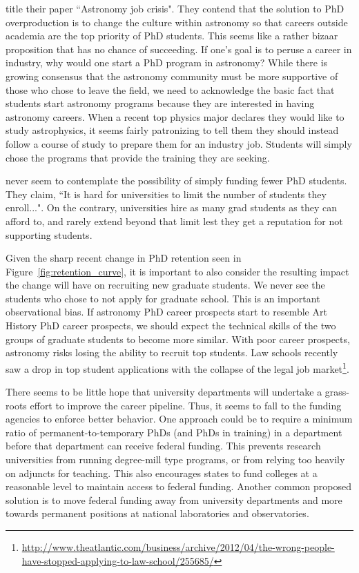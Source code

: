 \documentclass[preprint2]{aastex}
\begin{document}
\citet{Cooray15} title their paper ``Astronomy job crisis".  They contend that the solution to PhD overproduction is to change the culture within astronomy so that careers outside academia are the top priority of PhD students. This seems like a rather bizaar proposition that has no chance of succeeding. If one's goal is to peruse a career in industry, why would one start a PhD program in astronomy? While there is growing consensus that the astronomy community must be more supportive of those who chose to leave the field, we need to acknowledge the basic fact that students start astronomy programs because they are interested in having astronomy careers.  When a recent top physics major declares they would like to study astrophysics, it seems fairly patronizing to tell them they should instead follow a course of study to prepare them for an industry job. Students will simply chose the programs that provide the training they are seeking.

\citet{Cooray15} never seem to contemplate the possibility of simply funding fewer PhD students. They claim, ``It is hard for universities to limit the number of students they enroll...". On the contrary, universities hire as many grad students as they can afford to, and rarely extend beyond that limit lest they get a reputation for not supporting students.  

Given the sharp recent change in PhD retention seen in Figure~\ref{fig:retention_curve}, it is important to also consider the resulting impact the change will have on recruiting new graduate students. We never see the students who chose to not apply for graduate school. This is an important observational bias.  If astronomy PhD career prospects start to resemble Art History PhD career prospects, we should expect the technical skills of the two groups of graduate students to become more similar.  With poor career prospects, astronomy risks losing the ability to recruit top students. Law schools recently saw a drop in top student applications with the collapse of the legal job market\footnote{\url{http://www.theatlantic.com/business/archive/2012/04/the-wrong-people-have-stopped-applying-to-law-school/255685/}}.  

There seems to be little hope that university departments will undertake a grass-roots effort to improve the career pipeline. Thus, it seems to fall to the funding agencies to enforce better behavior.  One approach could be to require a minimum ratio of permanent-to-temporary PhDs (and PhDs in training) in a department before that department can receive federal funding.  This prevents research universities from running degree-mill type programs, or from relying too heavily on adjuncts for teaching.  This also encourages states to fund colleges at a reasonable level to maintain access to federal funding.  Another common proposed solution is to move federal funding away from university departments and more towards permanent positions at national laboratories and observatories.
\end{document}
